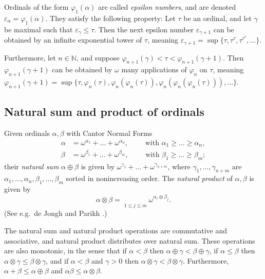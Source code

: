 \documentclass{article}
\theoremstyle{definition}
\newcommand{\N}{\mathbb N}
\begin{document}
    Ordinals of the form $\varphi_1(\alpha)$ are called \emph{epsilon numbers}, and are denoted $\varepsilon_\alpha = \varphi_1(\alpha)$. They satisfy the following property: Let $\tau$ be an ordinal, and let $\gamma$ be maximal such that $\varepsilon_\gamma\le \tau$. Then the next epsilon number $\varepsilon_{\gamma+1}$ can be obtained by an infinite exponential tower of $\tau$, meaning $\varepsilon_{\gamma+1}=\sup\{\tau, \tau^\tau, \tau^{\tau^\tau},\ldots\}$.

    Furthermore, let $n\in\N$, and suppose $\varphi_{n+1}(\gamma)<\tau<\varphi_{n+1}(\gamma+1)$. Then $\varphi_{n+1}(\gamma+1)$ can be obtained by $\omega$ many applications of $\varphi_n$ on $\tau$, meaning $\varphi_{n+1}(\gamma+1)=\sup\{\tau, \varphi_n(\tau), \varphi_n(\varphi_n(\tau)),\allowbreak\varphi_n(\varphi_n(\varphi_n(\tau))),\ldots\}$.

\subsection{Natural sum and product of ordinals}\label{subsec_natural}
Given ordinals $\alpha,\beta$ with Cantor Normal Forms 
\begin{align*}
\alpha &=\omega^{\alpha_1}+\ldots+\omega^{\alpha_n},\qquad\text{ with $\alpha_1\ge\ldots\ge \alpha_n$},\\
\beta &=\omega^{\beta_1}+\ldots+\omega^{\beta_m},\qquad\text{ with $\beta_1\ge\ldots\ge\beta_m$};
\end{align*}
their \emph{natural sum} $\alpha\oplus \beta$ is given by $\omega^{\gamma_1}+\ldots+\omega^{\gamma_{n+m}}$, where $\gamma_1,\ldots,\gamma_{n+m}$ are $\alpha_1,\ldots,\alpha_n,\beta_1,\ldots,\beta_m$ sorted in nonincreasing order. The \emph{natural product} of $\alpha,\beta$ is given by
\begin{equation*}
\alpha\otimes \beta=\mathop{\bigoplus\limits_{1\le i\le n}}\limits_{1\le j\le m}\omega^{\alpha_i\oplus \beta_j}.
\end{equation*}
(See e.g.~de Jongh and Parikh \cite{dejongh_parikh}.)

The natural sum and natural product operations are commutative and associative, and natural product distributes over natural sum. These operations are also monotonic, in the sense that if $\alpha<\beta$ then $\alpha\oplus\gamma<\beta\oplus\gamma$, if $\alpha\le\beta$ then $\alpha\otimes\gamma\le\beta\otimes\gamma$, and if $\alpha<\beta$ and $\gamma>0$ then $\alpha\otimes\gamma<\beta\otimes\gamma$. Furthermore, $\alpha+\beta\le\alpha\oplus\beta$ and $\alpha\beta\le\alpha\otimes\beta$.
\end{document}
